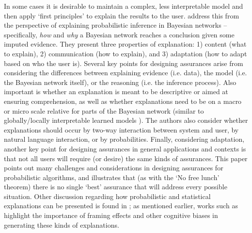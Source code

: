 In some cases it is desirable to maintain a complex, less interpretable model and then apply `first principles' to explain the results to the user. \citet{Lacave2002-cu} address this from the perspective of explaining probabilistic inference in Bayesian networks -- specifically, \emph{how} and \emph{why} a Bayesian network reaches a conclusion given some imputed evidence. 
They present three properties of explanation: 1) content (what to explain), 2) communication (how to explain), and 3) adaptation (how to adapt based on who the user is). %
Several key points for designing assurances arise from considering the differences between explaining evidence (i.e. data), the model (i.e. the Bayesian network itself), or the reasoning (i.e. the inference process). 
Also important is whether an explanation is meant to be descriptive or aimed at ensuring comprehension, as well as whether explanations need to be on a macro or micro scale relative for parts of the Bayesian network (similar to globally/locally interpretable learned models \citeauthor{Ruping2006-xj}). 
The authors also consider whether explanations should occur by two-way interaction between system and user, by natural language interaction, or by probabilities. Finally, considering adaptation, another key point for designing assurances in general applications and contexts is that not all users will require (or desire) the same kinds of assurances. This paper points out many challenges and considerations in designing assurances for probabilistic algorithms, and illustrates that (as with the `No free lunch' theorem) there is no single `best' assurance that will address every possible situation. 
Other discussion regarding how probabilistic and statistical explanations can be presented is found in \cite{Rouse1986-dz,Wallace2001-fm,Kuhn1997-qc,Lomas2012-ie,Swartout1983-ko}; 
as mentioned earlier, works such as \cite{Kuhn1997-qc} highlight the importance of framing effects and other cognitive biases in generating these kinds of explanations. 

